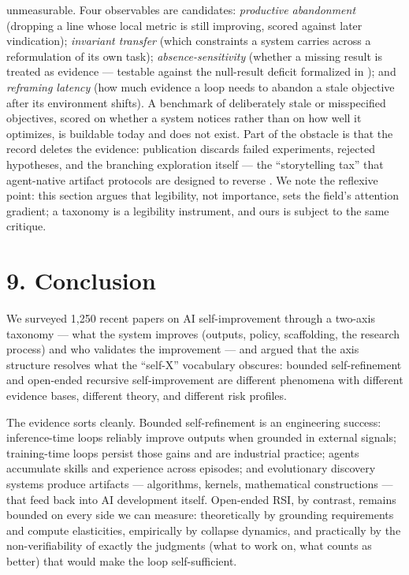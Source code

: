 \documentclass[
  11pt,
]{article}
\begin{document}
\begin{enumerate}
  unmeasurable. Four observables are candidates: \emph{productive
  abandonment} (dropping a line whose local metric is still improving,
  scored against later vindication); \emph{invariant transfer} (which
  constraints a system carries across a reformulation of its own task);
  \emph{absence-sensitivity} (whether a missing result is treated as
  evidence --- testable against the null-result deficit formalized in
  \citep{chauhan2026dead}); and \emph{reframing latency} (how much
  evidence a loop needs to abandon a stale objective after its
  environment shifts). A benchmark of deliberately stale or misspecified
  objectives, scored on whether a system notices rather than on how well
  it optimizes, is buildable today and does not exist. Part of the
  obstacle is that the record deletes the evidence: publication discards
  failed experiments, rejected hypotheses, and the branching exploration
  itself --- the ``storytelling tax'' that agent-native artifact
  protocols are designed to reverse \citep{liu2026last}. We note the
  reflexive point: this section argues that legibility, not importance,
  sets the field's attention gradient; a taxonomy is a legibility
  instrument, and ours is subject to the same critique.
\end{enumerate}

\section{9. Conclusion}\label{conclusion}

We surveyed 1,250 recent papers on AI self-improvement through a
two-axis taxonomy --- what the system improves (outputs, policy,
scaffolding, the research process) and who validates the improvement ---
and argued that the axis structure resolves what the ``self-X''
vocabulary obscures: bounded self-refinement and open-ended recursive
self-improvement are different phenomena with different evidence bases,
different theory, and different risk profiles.

The evidence sorts cleanly. Bounded self-refinement is an engineering
success: inference-time loops reliably improve outputs when grounded in
external signals; training-time loops persist those gains and are
industrial practice; agents accumulate skills and experience across
episodes; and evolutionary discovery systems produce artifacts ---
algorithms, kernels, mathematical constructions --- that feed back into
AI development itself. Open-ended RSI, by contrast, remains bounded on
every side we can measure: theoretically by grounding requirements and
compute elasticities, empirically by collapse dynamics, and practically
by the non-verifiability of exactly the judgments (what to work on, what
counts as better) that would make the loop self-sufficient.
\end{document}
